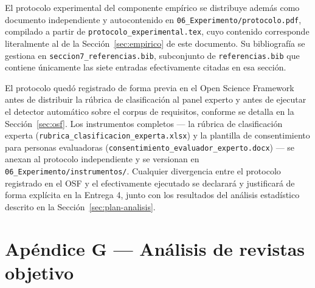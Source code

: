 \documentclass[journal,onecolumn]{IEEEtran}
\begin{document}
	El protocolo experimental del componente empírico se distribuye además como
	documento independiente y autocontenido en
	\texttt{06\_Experimento/protocolo.pdf}, compilado a partir de
	\texttt{protocolo\_experimental.tex}, cuyo contenido corresponde
	literalmente al de la Sección~\ref{sec:empirico} de este documento. Su
	bibliografía se gestiona en \texttt{seccion7\_referencias.bib}, subconjunto
	de \texttt{referencias.bib} que contiene únicamente las siete entradas
	efectivamente citadas en esa sección.
	
	El protocolo quedó registrado de forma previa en el Open Science Framework
	\cite{nosek2018} antes de distribuir la rúbrica de clasificación al panel
	experto y antes de ejecutar el detector automático sobre el corpus de
	requisitos, conforme se detalla en la Sección~\ref{sec:osf}. Los
	instrumentos completos --- la rúbrica de clasificación experta
	(\texttt{rubrica\_clasificacion\_experta.xlsx}) y la plantilla de
	consentimiento para personas evaluadoras
	(\texttt{consentimiento\_evaluador\_experto.docx}) --- se anexan al
	protocolo independiente y se versionan en
	\texttt{06\_Experimento/instrumentos/}. Cualquier divergencia entre el
	protocolo registrado en el OSF y el efectivamente ejecutado se declarará y
	justificará de forma explícita en la Entrega 4, junto con los resultados
	del análisis estadístico descrito en la Sección~\ref{sec:plan-analisis}.
	
	\section*{Apéndice G --- Análisis de revistas objetivo}
	\label{ap:revistas}
	
\end{document}
